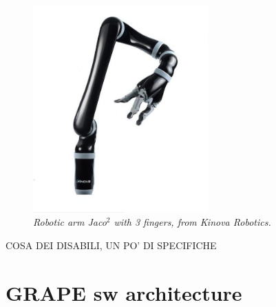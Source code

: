\begin{figure}
	\centering
	\includegraphics[width=0.6\textwidth]{Images/grape_sw_hw_architecture/kinova.jpg}
	\caption{\textit{Robotic arm Jaco$^2$ with 3 fingers, from Kinova Robotics.}}
	\label{fig:kinovaArm}
\end{figure}

COSA DEI DISABILI, UN PO' DI SPECIFICHE

\section{GRAPE sw architecture}\label{sec:grapeSwArch}


